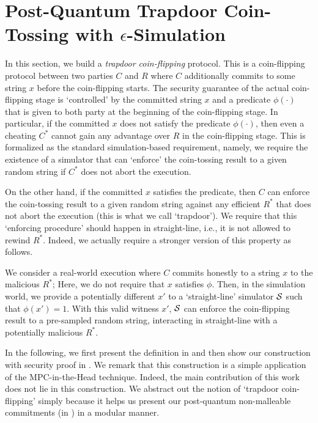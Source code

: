 
\section{Post-Quantum Trapdoor Coin-Tossing with $\epsilon$-Simulation}
\label{sec:td-cf}

In this section, we build a {\em trapdoor coin-flipping} protocol. This is a coin-flipping protocol between two parties $C$ and $R$ where $C$ additionally commits to some string $x$ before the coin-flipping starts. The security guarantee of the actual coin-flipping stage is `controlled' by the committed string $x$ and a predicate $\phi(\cdot)$ that is given to both party at the beginning of the coin-flipping stage. In particular, if the committed $x$ does not satisfy the predicate $\phi(\cdot)$, then even a cheating $C^*$ cannot gain any advantage over $R$ in the coin-flipping stage. This is formalized as the standard simulation-based requirement, namely, we require the existence of a simulator that can `enforce' the coin-tossing result to a given random string if $C^*$ does not abort the execution.

On the other hand, if the committed $x$ satisfies the predicate, then $C$ can enforce the coin-tossing result to a given random string against any efficient $R^*$ that does not abort the execution (this is what we call `trapdoor'). We require that this `enforcing procedure' should happen in straight-line, i.e., it is not allowed to rewind $R^*$. Indeed, we actually require a stronger version of this property as follows.

We consider a real-world execution where $C$ commits honestly to a string $x$ to the malicious $R^*$; Here, we do not require that $x$ satisfies $\phi$. Then, in the simulation world, we provide a potentially different $x'$ to a `straight-line' simulator $\mathcal{S}$ such that $\phi(x')=1$. With this valid witness $x'$, $\mathcal{S}$ can enforce the coin-flipping result to a pre-sampled random string, interacting in straight-line with a potentially malicious $R^*$.

In the following, we first present the definition in  and then show our construction with security proof in . We remark that this construction is a simple application of the MPC-in-the-Head technique. Indeed, the main contribution of this work does not lie in this construction. We abstract out the notion of `trapdoor coin-flipping' simply because it helps us present our post-quantum non-malleable commitments (in ) in a modular manner.  

